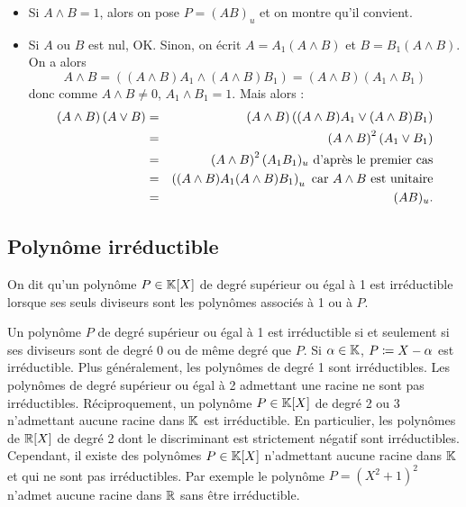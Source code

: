 \documentclass{magnolia}
\begin{document}
\begin{preuve}
\begin{itemize}
\item Si $A\wedge B=1$, alors on pose $P=(AB)_u$ et on montre qu'il convient.
\item Si $A$ ou $B$ est nul, OK. Sinon, on écrit $A=A_1(A\wedge B)$ et $B=B_1(A\wedge B)$. On a alors $$A\wedge B=((A\wedge B)A_1\wedge (A\wedge B)B_1)=(A\wedge B)(A_1\wedge B_1)$$
donc comme $A\wedge B\neq 0$, $A_1\wedge B_1=1$.
Mais alors :
\begin{eqnarray*}
\left(A\wedge B\right)\left(A\vee B\right)&=&\left(A\wedge B\right)\left((A\wedge B)A_1\vee (A\wedge B)B_1\right)\\
&=&\left(A\wedge B\right)^2(A_1\vee B_1)\\
&=&\left(A\wedge B\right)^2 (A_1B_1)_u \text{ d'après le premier cas}\\
&=&\left((A\wedge B)A_1 (A\wedge B)B_1\right)_u \text{ car $A\wedge B$ est unitaire}\\
&=& (AB)_u.
\end{eqnarray*}
\end{itemize}

\end{preuve}

\subsection{Polynôme irréductible}

\begin{definition}
On dit qu'un polynôme $P\in\polyK$ de degré supérieur ou égal à 1 est
irréductible lorsque ses seuls diviseurs sont les polynômes associés à 1
ou à $P$.
\end{definition}

\begin{remarques}
\remarque Un polynôme $P$ de degré supérieur ou égal à 1 est irréductible
  si et seulement si ses diviseurs sont de degré 0 ou de même degré
  que $P$.
\remarque Si $\alpha\in\mathbb{K}$, $P\coloneqq X-\alpha$ est irréductible. Plus généralement,
  les polynômes de degré 1 sont irréductibles.
\remarque Les polynômes de degré supérieur ou égal à 2 admettant une racine ne
  sont pas irréductibles.
\remarque Réciproquement, un polynôme $P\in\polyK$ de degré 2 ou 3 n'admettant aucune racine dans $\mathbb{K}$ est irréductible.
  En particulier, les polynômes de $\polyR$ de degré 2 dont le discriminant est strictement
  négatif sont irréductibles.
  Cependant, il existe des polynômes $P\in\polyK$ n'admettant aucune racine
  dans $\mathbb{K}$ et qui ne sont pas irréductibles. Par exemple le polynôme
  $P=(X^2+1)^2$ n'admet aucune racine dans $\mathbb{R}$ sans être irréductible.
\end{remarques}
\end{document}
